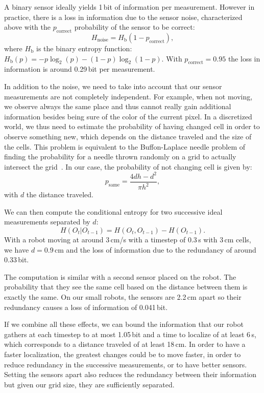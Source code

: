 \documentclass[letterpaper, 10pt, conference]{ieeeconf}
\begin{document}
A binary sensor ideally yields 1\,bit of information per measurement.
However in practice, there is a loss in information due to the sensor noise, characterized above with the $p_\mathrm{correct}$ probability of the sensor to be correct:
\begin{displaymath}
	H_\mathrm{noise} = H_{\text{b}}(1 - p_\mathrm{correct}),
\end{displaymath}
where $H_{\text{b}}$ is the binary entropy function: $H_{\text{b}}(p) = -p\log_2(p) - (1-p)\log_2(1-p)$.
With $p_\mathrm{correct}=0.95$ the loss in information is around 0.29\,bit per measurement.

In addition to the noise, we need to take into account that our sensor measurements are not completely independent.
For example, when not moving, we observe always the same place and thus cannot really gain additional information besides being sure of the color of the current pixel.
In a discretized world, we thus need to estimate the probability of having changed cell in order to observe something new, which depends on the distance traveled and the size of the cells.
This problem is equivalent to the Buffon-Laplace needle problem of finding the probability for a needle thrown randomly on a grid to actually intersect the grid~\cite{laplace1820prob}.
In our case, the probability of not changing cell is given by:
\begin{displaymath}
	p_\mathrm{same} = \frac{4d h - d^2}{\pi h^2},
\end{displaymath}
with $d$ the distance traveled.

We can then compute the conditional entropy for two successive ideal measurements separated by $d$:
\begin{displaymath}
	H(O_t | O_{t-1}) = H(O_t, O_{t-1}) - H(O_{t-1}).
\end{displaymath}
With a robot moving at around 3\,cm/s with a timestep of 0.3\,s with 3\,cm cells, we have $d=0.9$\,cm and the loss of information due to the redundancy of around 0.33\,bit.

The computation is similar with a second sensor placed on the robot.
The probability that they see the same cell based on the distance between them is exactly the same.
On our small robots, the sensors are 2.2\,cm apart so their redundancy causes a loss of information of 0.041\,bit.

If we combine all these effects, we can bound the information that our robot gathers at each timestep to at most 1.05\,bit and a time to localize of at least 6\,s, which corresponds to a distance traveled of at least 18\,cm.
In order to have a faster localization, the greatest changes could be to move faster, in order to reduce redundancy in the successive measurements, or to have better sensors.
Setting the sensors apart also reduces the redundancy between their information but given our grid size, they are sufficiently separated.
\end{document}
